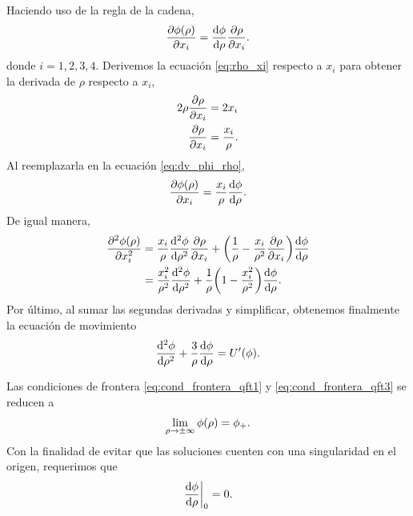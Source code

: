Haciendo uso de la regla de la cadena, 
\begin{equation} \label{eq:dv_phi_rho}
	\pdv{\phi\qty(\rho)}{x_i} = \dv{\phi}{\rho}\pdv{\rho}{x_i}.
\end{equation}
donde $i = 1, 2, 3, 4$. 
Derivemos la ecuación \eqref{eq:rho_xi} respecto a $x_i$ para obtener la derivada de $\rho$ respecto a $x_i$, 
\begin{align}
2\rho \pdv{\rho}{x_i} &= 2x_i \\ \label{eq:dv_rho_xi}
\pdv{\rho}{x_i} &= \frac{x_i}{\rho}.
\end{align}
Al reemplazarla 
en la ecuación \eqref{eq:dv_phi_rho}, 
\begin{equation} \label{eq:dv_phi_rho2}
\pdv{\phi\qty(\rho)}{x_i} = \frac{x_i}{\rho}\dv{\phi}{\rho}.
\end{equation}
De igual manera, %
\begin{align}
	\pdv[2]{\phi\qty(\rho)}{x_i} &= \frac{x_i}{\rho}\dv[2]{\phi}{\rho}\pdv{\rho}{x_i} + \qty(\frac{1}{\rho} - \frac{x_i}{\rho^2}\pdv{\rho}{x_i})\dv{\phi}{\rho} \\
	&= \frac{x_i^2}{\rho^2}\dv[2]{\phi}{\rho} + \frac{1}{\rho}\qty(1 - \frac{x_i^2}{\rho^2})\dv{\phi}{\rho}. 
\end{align}
Por último, al sumar las segundas derivadas
y simplificar, obtenemos finalmente la ecuación de movimiento 
\begin{equation} \label{eq:eom_rho}
	\dv[2]{\phi}{\rho} + \frac{3}{\rho}\dv{\phi}{\rho} = U'\qty(\phi).
\end{equation}

Las condiciones de frontera \eqref{eq:cond_frontera_qft1} y \eqref{eq:cond_frontera_qft3} se reducen a 
\begin{equation} \label{eq:cond_frontera_rho1}
\lim_{\rho \rightarrow \pm\infty} \phi\qty(\rho) = \phi_+.
\end{equation}
Con la finalidad de evitar que las soluciones cuenten con una singularidad en el origen, requerimos que \cite{coleman1977fate}
\begin{equation} \label{eq:cond_frontera_rho2}
	\eval{\dv{\phi}{\rho}}_0 = 0.
\end{equation}


